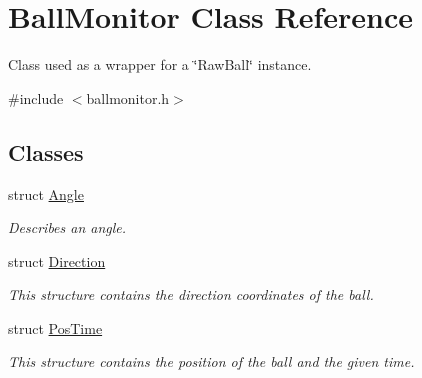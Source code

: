 \hypertarget{classBallMonitor}{
\section{BallMonitor Class Reference}
\label{classBallMonitor}
}


Class used as a wrapper for a \char`\"{}RawBall\char`\"{} instance.  




{\ttfamily \#include $<$ballmonitor.h$>$}

\subsection*{Classes}
\begin{DoxyCompactItemize}
\item 
struct \hyperlink{structBallMonitor_1_1Angle}{Angle}
\begin{DoxyCompactList}\small\item\em Describes an angle. \item\end{DoxyCompactList}\item 
struct \hyperlink{structBallMonitor_1_1Direction}{Direction}
\begin{DoxyCompactList}\small\item\em This structure contains the direction coordinates of the ball. \item\end{DoxyCompactList}\item 
struct \hyperlink{structBallMonitor_1_1PosTime}{PosTime}
\begin{DoxyCompactList}\small\item\em This structure contains the position of the ball and the given time. \item\end{DoxyCompactList}\end{DoxyCompactItemize}
